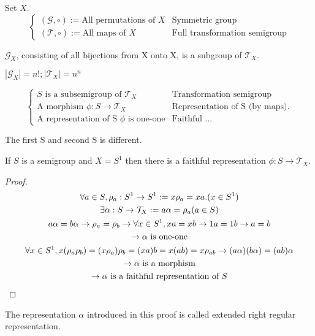 \begin{Def}Set $X$.
    \[
    \begin{cases}
        (\mathcal{G},\circ):= \text{All permutations of }X  &  \text{Symmetric group}   \\
        (\mathcal{T},\circ):= \text{All maps of }X          &   \text{Full transformation semigroup}
    \end{cases}\]
    
    $\mathcal{G}_X$, consisting of all bijections from X onto X, is a subgroup of $\mathcal{T}_X$.

    $|\mathcal{G}_X|=n!; |\mathcal{T}_X|=n^n$
\end{Def}

\begin{Def}
    \[\begin{cases}
        S \text{ is a subsemigroup of }\mathcal{T}_X   &   \text{Transformation semigroup} \\
        \text{A morphism }\phi: S \rightarrow \mathcal{T}_X &   \text{Representation of S (by maps).}   \\
        \text{A representation of S }\phi \text{ is one-one} &  \text{Faithful ...}
    \end{cases}\]
    
    The first S and second S is different.
\end{Def}

\begin{Them}
    If $S$ is a semigroup and $X=S^1$ then there is a faithful representation $\phi:S \rightarrow \mathcal{T}_X$.
    \begin{proof}
        \begin{gather*}
            \forall a \in S, \rho_a : S^1\rightarrow S^1:= x\rho_a=xa. (x\in S^1)    \\
            \exists \alpha: S\rightarrow\mathcal{T}_X:=a\alpha=\rho_a(a\in S)   \\
            a\alpha=b\alpha \rightarrow \rho_a=\rho_b\rightarrow  \forall x \in S^1,xa=xb\rightarrow 1a=1b \rightarrow a=b  \\
            \rightarrow \alpha \text{\space is one-one} \\
            \forall x \in S^1,x(\rho_a\rho_b)=(x\rho_a)\rho_b=(xa)b=x(ab)=x\rho_{ab} \rightarrow (a\alpha)(b\alpha)=(ab)\alpha  \\
            \rightarrow \alpha \text{\space is a morphism}  \\
            \rightarrow \alpha \text{\space is a faithful representation of }S
        \end{gather*}
    \end{proof}

    The representation $\alpha$ introduced in this proof is called extended right regular representation.
\end{Them}

